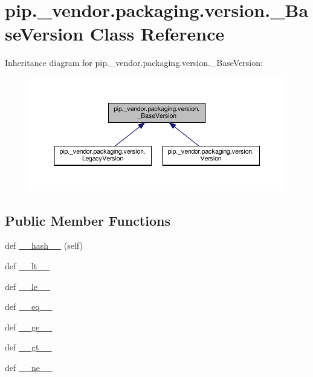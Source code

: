 \hypertarget{classpip_1_1__vendor_1_1packaging_1_1version_1_1__BaseVersion}{}\section{pip.\+\_\+vendor.\+packaging.\+version.\+\_\+\+Base\+Version Class Reference}
\label{classpip_1_1__vendor_1_1packaging_1_1version_1_1__BaseVersion}


Inheritance diagram for pip.\+\_\+vendor.\+packaging.\+version.\+\_\+\+Base\+Version\+:
\nopagebreak
\begin{figure}[H]
\begin{center}
\leavevmode
\includegraphics[width=350pt]{classpip_1_1__vendor_1_1packaging_1_1version_1_1__BaseVersion__inherit__graph}
\end{center}
\end{figure}
\subsection*{Public Member Functions}
\begin{DoxyCompactItemize}
\item 
def \hyperlink{classpip_1_1__vendor_1_1packaging_1_1version_1_1__BaseVersion_a892eaa387d290f7bfba054a3bd4a9b22}{\+\_\+\+\_\+hash\+\_\+\+\_\+} (self)
\item 
def \hyperlink{classpip_1_1__vendor_1_1packaging_1_1version_1_1__BaseVersion_a9394fe451a892c30e78424d443a9cd92}{\+\_\+\+\_\+lt\+\_\+\+\_\+}
\item 
def \hyperlink{classpip_1_1__vendor_1_1packaging_1_1version_1_1__BaseVersion_a52efa3843bc8b2054373550a74fa2a3a}{\+\_\+\+\_\+le\+\_\+\+\_\+}
\item 
def \hyperlink{classpip_1_1__vendor_1_1packaging_1_1version_1_1__BaseVersion_a335f821c05d17489d0823bc911cbb5a2}{\+\_\+\+\_\+eq\+\_\+\+\_\+}
\item 
def \hyperlink{classpip_1_1__vendor_1_1packaging_1_1version_1_1__BaseVersion_a1bf34488c3d9f703e6f3aa0c03fe2f3d}{\+\_\+\+\_\+ge\+\_\+\+\_\+}
\item 
def \hyperlink{classpip_1_1__vendor_1_1packaging_1_1version_1_1__BaseVersion_a6d0cc6b95a9bbd22fd02e2d307505fbb}{\+\_\+\+\_\+gt\+\_\+\+\_\+}
\item 
def \hyperlink{classpip_1_1__vendor_1_1packaging_1_1version_1_1__BaseVersion_a97583874a4f1febff53f09907135d16e}{\+\_\+\+\_\+ne\+\_\+\+\_\+}
\end{DoxyCompactItemize}



